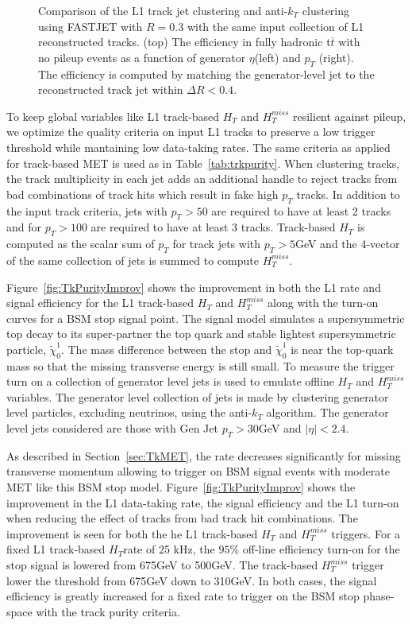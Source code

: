 \begin{figure}[htbp!]
\caption{Comparison of the L1 track jet clustering and anti-$k_{T}$ clustering using FASTJET with $R=0.3$ with the same input collection of L1 reconstructed tracks. (top) The efficiency in fully hadronic t$\overline{t}$ with no pileup events as a function of generator $\eta$(left) and $p_{T}$ (right). The efficiency is computed by matching the generator-level jet to the reconstructed track jet within $\Delta R<0.4$. }
\label{fig:TkJetEfficiency}
\end{figure}

To keep global variables like L1 track-based $H_{T}$ and $H^{miss}_{T}$ resilient against pileup, we optimize the quality criteria on input L1 tracks to preserve a low trigger threshold while mantaining low data-taking rates. The same criteria as applied for track-based MET is used as in Table~\ref{tab:trkpurity}. When clustering tracks, the track multiplicity in each jet adds an additional handle to reject tracks from bad combinations of track hits which result in fake high $p_{T}$ tracks. In addition to the input track criteria, jets with $p_{T}>50$ are required to have at least 2 tracks and for $p_{T}>100$ are required to have at least 3 tracks. Track-based $H_{T}$  is computed as the scalar sum of $p_{T}$ for track jets with $p_{T}>5$GeV and the 4-vector of the same collection of jets is summed to compute $H^{miss}_{T}$. 

Figure~\ref{fig:TkPurityImprov} shows the improvement in both the L1 rate and signal efficiency for the L1 track-based $H_{T}$ and $H^{miss}_{T}$ along with the turn-on curves for a BSM stop signal point. The signal model simulates a supersymmetric top decay to its super-partner the top quark and stable lightest supersymmetric particle, $\tilde{\chi}^{1}_{0}$. The mass difference between the stop and $\tilde{\chi}^{1}_{0}$ is near the top-quark mass so that the missing transverse energy is still small. To measure the trigger turn on a collection of generator level jets is used to emulate offline  $H_{T}$ and $H^{miss}_{T}$ variables. The generator level collection of jets is made by clustering generator level particles, excluding neutrinos, using the anti-$k_{T}$ algorithm. The generator level jets considered are those with Gen Jet $p_{T}>30$GeV and $\vert\eta\vert<2.4$. 

As described in Section~\ref{sec:TkMET}, the rate decreases significantly for missing transverse momentum allowing to trigger on BSM signal events with moderate MET like this BSM stop model. Figure~\ref{fig:TkPurityImprov} shows the improvement in the L1 data-taking rate, the signal efficiency and the L1 turn-on when reducing the effect of tracks from bad track hit combinations. The improvement is seen for both the he L1 track-based $H_{T}$ and  $H^{miss}_{T}$ triggers. For a fixed L1 track-based $H_{T}$rate of 25 kHz, the $95\%$ off-line efficiency turn-on for the stop signal is lowered from 675GeV to 500GeV. The track-based $H^{miss}_{T}$  trigger lower the threshold from 675GeV down to 310GeV. In both cases, the signal efficiency is greatly increased for a fixed rate to trigger on the BSM stop phase-space with the track purity criteria.

